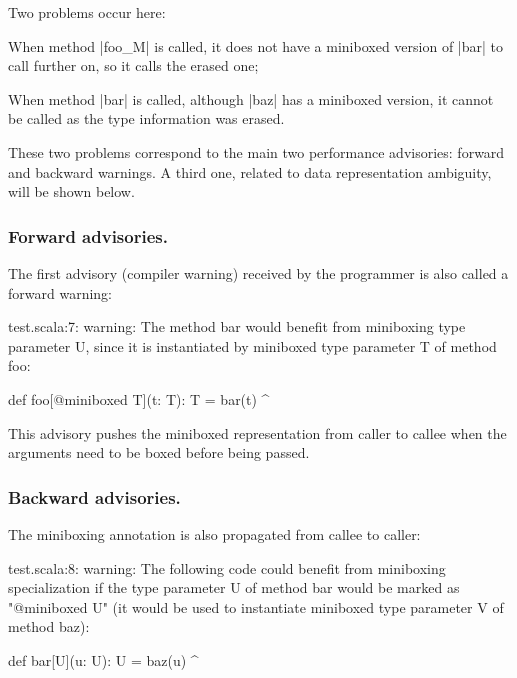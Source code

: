 Two problems occur here:

\begin{compactitem}
 \item When method |foo_M| is called, it does not have a miniboxed version of |bar| to call further on, so it calls the erased one;
 \item When method |bar| is called, although |baz| has a miniboxed version, it cannot be called as the type information was erased.
\end{compactitem}

These two problems correspond to the main two performance advisories: forward and backward warnings. A third one, related to data representation ambiguity, will be shown below.

\subsubsection{Forward advisories.} The first advisory (compiler warning) received by the programmer is also called a forward warning:

\begin{lstlisting-nobreak-nolang}
test.scala:7: warning: The method bar would benefit from miniboxing type parameter U, since it is instantiated by miniboxed type parameter T of method foo:

       def foo[@miniboxed T](t: T): T = bar(t)
                                                   ^
\end{lstlisting-nobreak-nolang}

This advisory pushes the miniboxed representation from caller to callee when the arguments need to be boxed before being passed.

\subsubsection{Backward advisories.} The miniboxing annotation is also propagated from callee to caller:

\begin{lstlisting-nobreak-nolang}
test.scala:8: warning: The following code could benefit from miniboxing specialization if the type parameter U of method bar would be marked as "@miniboxed U" (it would be used to instantiate miniboxed type parameter V of method baz):

        def bar[U](u: U): U = baz(u)
                                     ^
\end{lstlisting-nobreak-nolang}

